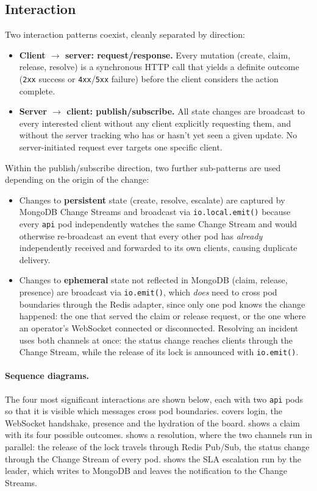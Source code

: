 \documentclass{scrartcl}
\begin{document}
\subsection{Interaction}\label{interaction}
 
Two interaction patterns coexist, cleanly separated by direction:
%
\begin{itemize}
  \item \textbf{Client $\to$ server: request/response.} Every mutation (create, claim, release, resolve) is a synchronous HTTP call that yields a definite outcome (\texttt{2xx} success or \texttt{4xx}/\texttt{5xx} failure) before the client considers the action complete.
  \item \textbf{Server $\to$ client: publish/subscribe.} All state changes are broadcast to every interested client without any client explicitly requesting them, and without the server tracking who has or hasn't yet seen a given update. No server-initiated request ever targets one specific client.
\end{itemize}
 
Within the publish/subscribe direction, two further sub-patterns are used depending on the origin of the change:
%
\begin{itemize}
  \item Changes to \textbf{persistent} state (create, resolve, escalate) are captured by MongoDB Change Streams and broadcast via \texttt{io.local.emit()} because every \texttt{api} pod independently watches the same Change Stream and would otherwise re-broadcast an event that every other pod has \emph{already} independently received and forwarded to its own clients, causing duplicate delivery.
  \item Changes to \textbf{ephemeral} state not reflected in MongoDB (claim, release, presence) are broadcast via \texttt{io.emit()}, which \emph{does} need to cross pod boundaries through the Redis adapter, since only one pod knows the change happened: the one that served the claim or release request, or the one where an operator's WebSocket connected or disconnected. Resolving an incident uses both channels at once: the status change reaches clients through the Change Stream, while the release of its lock is announced with \texttt{io.emit()}.
\end{itemize}
%
\paragraph{Sequence diagrams.} The four most significant interactions are shown below, each with two \texttt{api} pods so that it is visible which messages cross pod boundaries.  covers login, the WebSocket handshake, presence and the hydration of the board.  shows a claim with its four possible outcomes.  shows a resolution, where the two channels run in parallel: the release of the lock travels through Redis Pub/Sub, the status change through the Change Stream of every pod.  shows the SLA escalation run by the leader, which writes to MongoDB and leaves the notification to the Change Streams.
\end{document}
